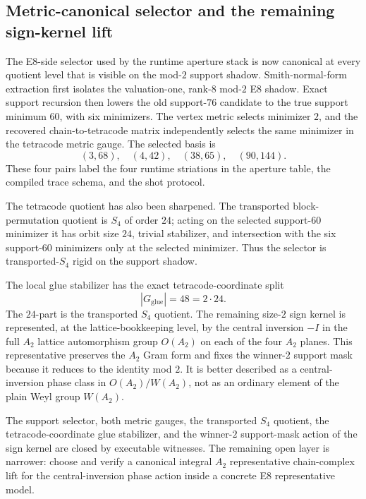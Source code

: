 %

\subsection{Metric-canonical selector and the remaining sign-kernel lift}

The E8-side selector used by the runtime aperture stack is now canonical at every quotient level that is
visible on the mod-$2$ support shadow.  Smith-normal-form extraction first isolates the valuation-one,
rank-$8$ mod-$2$ E8 shadow.  Exact support recursion then lowers the old support-$76$ candidate to the
true support minimum $60$, with six minimizers.  The vertex metric selects minimizer $2$, and the
recovered chain-to-tetracode matrix independently selects the same minimizer in the tetracode metric
gauge.  The selected basis is
\[
  (3,68),\quad (4,42),\quad (38,65),\quad (90,144).
\]
These four pairs label the four runtime striations in the aperture table, the compiled trace schema, and
the shot protocol.

The tetracode quotient has also been sharpened.  The transported block-permutation quotient is $S_4$ of
order $24$; acting on the selected support-$60$ minimizer it has orbit size $24$, trivial stabilizer, and
intersection with the six support-$60$ minimizers only at the selected minimizer.  Thus the selector is
transported-$S_4$ rigid on the support shadow.

The local glue stabilizer has the exact tetracode-coordinate split
\[
  |G_{\mathrm{glue}}|=48=2\cdot24.
\]
The $24$-part is the transported $S_4$ quotient.  The remaining size-$2$ sign kernel is represented, at
the lattice-bookkeeping level, by the central inversion $-I$ in the full $A_2$ lattice automorphism group
$O(A_2)$ on each of the four $A_2$ planes.  This representative preserves the $A_2$ Gram form and fixes
the winner-$2$ support mask because it reduces to the identity mod $2$.  It is better described as a
central-inversion phase class in $O(A_2)/W(A_2)$, not as an ordinary element of the plain Weyl group
$W(A_2)$.

\begin{honestbox}
The support selector, both metric gauges, the transported $S_4$ quotient, the tetracode-coordinate glue
stabilizer, and the winner-$2$ support-mask action of the sign kernel are closed by executable witnesses.
The remaining open layer is narrower: choose and verify a canonical integral $A_2$ representative
chain-complex lift for the central-inversion phase action inside a concrete E8 representative model.
\end{honestbox}

